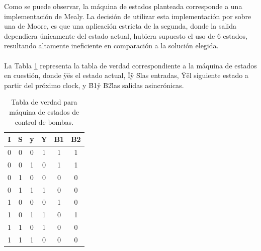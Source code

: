 Como se puede observar, la máquina de estados planteada corresponde a una implementación de Mealy.
La decisión de utilizar esta implementación por sobre una de Moore, es que una aplicación estricta de la segunda, donde la salida dependiera únicamente del estado actual,
hubiera supuesto el uso de 6 estados, resultando altamente ineficiente en comparación a la solución elegida.\\
\\
La Tabla \ref{tab:truth_table_ex1} representa la tabla de verdad correspondiente a la máquina de estados en cuestión, donde \"y\" es el estado actual, \"I\" y \"S\" las entradas,
\"Y\" el siguiente estado a partir del próximo clock, y \"B1\" y \"B2\" las salidas asincrónicas. 
\begin{table}[H]
    \centering
    \begin{tabular}{ccc|ccc}
    \textbf{I} & \textbf{S} & \textbf{y} & Y & B1 & B2 \\ \hline
    0          & 0          & 0          & 1 & 1  & 1  \\
    0          & 0          & 1          & 0 & 1  & 1  \\
    0          & 1          & 0          & 0 & 0  & 0  \\
    0          & 1          & 1          & 1 & 0  & 0  \\
    1          & 0          & 0          & 0 & 1  & 0  \\
    1          & 0          & 1          & 1 & 0  & 1  \\
    1          & 1          & 0          & 1 & 0  & 0  \\
    1          & 1          & 1          & 0 & 0  & 0 
    \end{tabular}
    \caption{Tabla de verdad para máquina de estados de control de bombas.}
    \label{tab:truth_table_ex1}
    \end{table}

